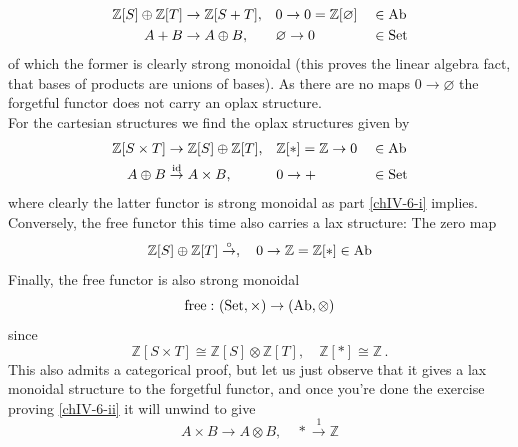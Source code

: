 \begin{enumerate}[label=\roman*)]
                \begin{align*}
                    \mathbb{Z}[S] \oplus \mathbb{Z}[T] &\to \mathbb{Z}[S + T],  &&0 \to 0 = \mathbb{Z}[\varnothing] &&\in \operatorname{Ab} \\
                    A + B &\to A \oplus B, &&\varnothing \to 0 &&\in \operatorname{Set}
                \end{align*}
                of which the former is clearly strong monoidal (this proves the linear algebra fact, that bases of products are unions of bases). As there are no maps $0 \to \varnothing$ the forgetful functor does not carry an oplax structure. \\
                For the cartesian structures we find the oplax structures given by
                \begin{align*}
                    \mathbb{Z}[S \times T] &\to \mathbb{Z}[S] \oplus \mathbb{Z}[T], &&\mathbb{Z}[*] = \mathbb{Z} \to 0 &&\in \operatorname{Ab} \\
                    A \oplus B &\overset{\operatorname{id}}{\rightarrow} A \times B, &&0 \to + &&\in \operatorname{Set}
                \end{align*}
                where clearly the latter functor is strong monoidal as part \ref{chIV-6-i} implies. Conversely, the free functor this time also carries a lax structure: The zero map
                \begin{equation*}
                    \mathbb{Z}[S] \oplus \mathbb{Z}[T] \overset{\circ}{\rightarrow}, \quad 0 \to \mathbb{Z} = \mathbb{Z}[*] \in \operatorname{Ab}
                \end{equation*}
                Finally, the free functor is also strong monoidal
                \begin{equation*}
                    \text{free} \,\colon (\operatorname{Set}, \times) \to (\operatorname{Ab}, \otimes)
                \end{equation*}
                since
                \begin{equation*}
                    \mathbb{Z}[S \times T] \cong \mathbb{Z}[S] \otimes \mathbb{Z}[T], \quad \mathbb{Z}[*] \cong \mathbb{Z} \,. 
                \end{equation*}
                This also admits a categorical proof, but let us just observe that it gives a lax monoidal structure to the forgetful functor, and once you're done the exercise proving \ref{chIV-6-ii} it will unwind to give
                \begin{equation*}
                    A \times B \to A \otimes B, \quad * \overset{1}{\rightarrow} \mathbb{Z}
                \end{equation*}

\end{enumerate}
